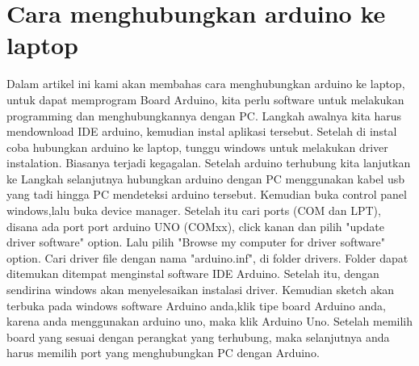 \section{Cara menghubungkan arduino ke laptop}
Dalam artikel ini kami akan membahas cara menghubungkan arduino ke laptop, untuk dapat memprogram Board Arduino, kita perlu software untuk melakukan programming dan menghubungkannya dengan PC. Langkah awalnya kita harus mendownload IDE arduino, kemudian instal aplikasi tersebut. Setelah di instal coba hubungkan arduino ke laptop, tunggu windows untuk melakukan driver instalation. Biasanya terjadi kegagalan.
Setelah arduino terhubung kita lanjutkan ke Langkah selanjutnya hubungkan arduino dengan PC menggunakan kabel usb yang tadi hingga PC mendeteksi arduino tersebut. Kemudian buka control panel windows,lalu buka device manager. Setelah itu cari ports (COM dan LPT), disana ada port port arduino UNO (COMxx), click kanan dan pilih "update driver software" option.
Lalu pilih "Browse my computer for driver software" option. Cari driver file dengan nama "arduino.inf", di folder drivers. Folder dapat ditemukan ditempat menginstal software IDE Arduino.
Setelah itu, dengan sendirina windows akan menyelesaikan instalasi driver. Kemudian sketch akan terbuka pada windows software Arduino anda,klik tipe board Arduino anda, karena anda menggunakan arduino uno, maka klik Arduino Uno.
Setelah memilih board yang sesuai dengan perangkat yang terhubung, maka selanjutnya anda harus memilih port yang menghubungkan PC dengan Arduino.
